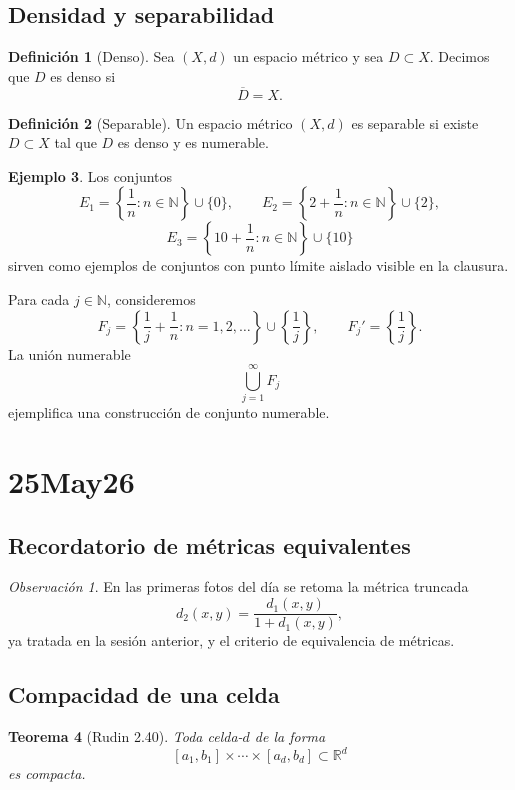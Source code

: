 \documentclass[12pt]{article}
\theoremstyle{definition}
\newtheorem{definition}{Definición}[section]
\newtheorem{example}[definition]{Ejemplo}
\theoremstyle{plain}
\newtheorem{theorem}[definition]{Teorema}
\theoremstyle{remark}
\newtheorem*{remark}{Observación}
\begin{document}
\subsection*{Densidad y separabilidad}

\begin{definition}[Denso]
Sea $(X,d)$ un espacio métrico y sea $D\subset X$.
Decimos que $D$ es denso si
\[
\overline D=X.
\]
\end{definition}

\begin{definition}[Separable]
Un espacio métrico $(X,d)$ es separable si existe $D\subset X$ tal que $D$ es denso y es numerable.
\end{definition}

\begin{example}
Los conjuntos
\[
E_1=\left\{\frac1n:n\in\mathbb N\right\}\cup\{0\},\qquad
E_2=\left\{2+\frac1n:n\in\mathbb N\right\}\cup\{2\},
\]
\[
E_3=\left\{10+\frac1n:n\in\mathbb N\right\}\cup\{10\}
\]
sirven como ejemplos de conjuntos con punto límite aislado visible en la clausura.

Para cada $j\in\mathbb N$, consideremos
\[
F_j=\left\{\frac1j+\frac1n:n=1,2,\dots\right\}\cup\left\{\frac1j\right\},
\qquad
F_j'=\left\{\frac1j\right\}.
\]
La unión numerable
\[
\bigcup_{j=1}^\infty F_j
\]
ejemplifica una construcción de conjunto numerable.
\end{example}

\section*{25May26}

\subsection*{Recordatorio de métricas equivalentes}

\begin{remark}
En las primeras fotos del día se retoma la métrica truncada
\[
d_2(x,y)=\frac{d_1(x,y)}{1+d_1(x,y)},
\]
ya tratada en la sesión anterior, y el criterio de equivalencia de métricas.
\end{remark}

\subsection*{Compacidad de una celda}

\begin{theorem}[Rudin 2.40]
Toda celda-$d$ de la forma
\[
[a_1,b_1]\times\cdots\times[a_d,b_d]\subset\mathbb R^d
\]
es compacta.
\end{theorem}
\end{document}
